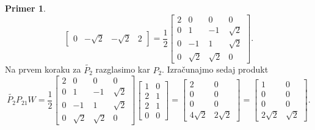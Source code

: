 \documentclass[mat1]{article}
\theoremstyle{definition}
\newtheorem{primer}{Primer}[section]
\begin{document}
\begin{primer}
$$\begin{bmatrix}
0 & -\sqrt{2} & -\sqrt{2} & 2
\end{bmatrix} =
\frac{1}{2}
\begin{bmatrix}
2 & 0 & 0 & 0 \\
0 & 1 & -1 & \sqrt{2} \\
0 & -1 & 1 & \sqrt{2} \\
0 & \sqrt{2} & \sqrt{2} & 0
\end{bmatrix}
\text{.}
$$
Na prvem koraku za $\tilde{P_2}$ razglasimo kar $P_2$. Izračunajmo sedaj produkt
$$
\tilde{P_2} P_{21} W =
\frac{1}{2}
\begin{bmatrix}
2 & 0 & 0 & 0 \\
0 & 1 & -1 & \sqrt{2} \\
0 & -1 & 1 & \sqrt{2} \\
0 & \sqrt{2} & \sqrt{2} & 0
\end{bmatrix}
\begin{bmatrix}
1 & 0 \\
2 & 1 \\
2 & 1 \\
0 & 0
\end{bmatrix} =
\begin{bmatrix}
2 & 0 \\
0 & 0 \\
0 & 0 \\
4\sqrt{2} & 2\sqrt{2}
\end{bmatrix} = 
\begin{bmatrix}
1 & 0 \\
0 & 0 \\
0 & 0 \\
2\sqrt{2} & \sqrt{2}
\end{bmatrix}
\text{.}
$$


\end{primer}
\end{document}
